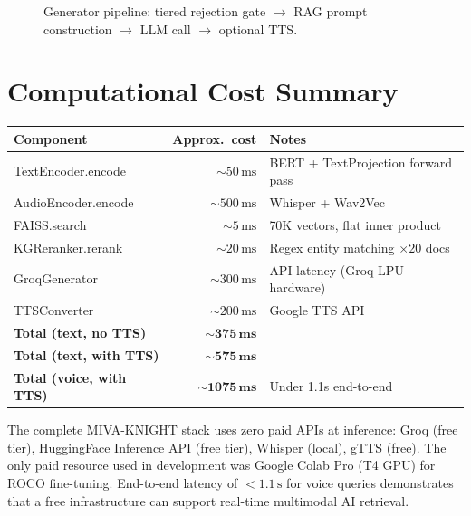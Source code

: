 \documentclass[12pt,a4paper]{article}
\theoremstyle{definition}
\theoremstyle{plain}
\theoremstyle{remark}
\begin{document}
\begin{figure}[ht]
{}
\caption{Generator pipeline: tiered rejection gate $\to$ RAG prompt construction $\to$ LLM call $\to$ optional TTS.}
\end{figure}

\section{Computational Cost Summary}

\begin{center}
\begin{tabular}{lrl}
\toprule
\textbf{Component} & \textbf{Approx.\ cost} & \textbf{Notes}\\
\midrule
TextEncoder.encode & $\sim 50\,\text{ms}$ & BERT + TextProjection forward pass\\
AudioEncoder.encode & $\sim 500\,\text{ms}$ & Whisper + Wav2Vec\\
FAISS.search & $\sim 5\,\text{ms}$ & 70K vectors, flat inner product\\
KGReranker.rerank & $\sim 20\,\text{ms}$ & Regex entity matching $\times 20$ docs\\
GroqGenerator & $\sim 300\,\text{ms}$ & API latency (Groq LPU hardware)\\
TTSConverter & $\sim 200\,\text{ms}$ & Google TTS API\\
\midrule
\textbf{Total (text, no TTS)} & $\mathbf{\sim 375\,\text{ms}}$ & \\
\textbf{Total (text, with TTS)} & $\mathbf{\sim 575\,\text{ms}}$ & \\
\textbf{Total (voice, with TTS)} & $\mathbf{\sim 1075\,\text{ms}}$ & Under 1.1s end-to-end\\
\bottomrule
\end{tabular}
\end{center}

\begin{tcolorbox}[thmstyle, title={Theorem 8.1 — Free-Stack Viability}]
The complete MIVA-KNIGHT stack uses zero paid APIs at inference: Groq (free tier), HuggingFace Inference API (free tier), Whisper (local), gTTS (free). The only paid resource used in development was Google Colab Pro (T4 GPU) for ROCO fine-tuning. End-to-end latency of $< 1.1\,\text{s}$ for voice queries demonstrates that a free infrastructure can support real-time multimodal AI retrieval.
\end{tcolorbox}
\end{document}
